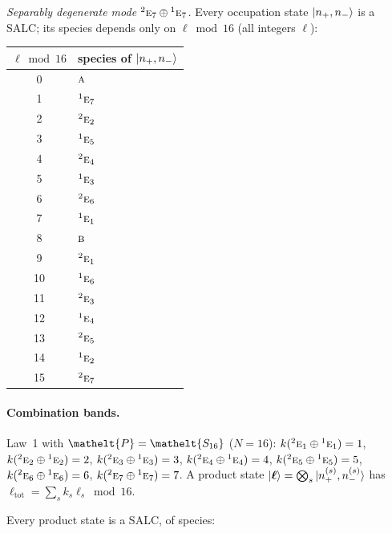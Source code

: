 \documentclass[11pt]{article}
\newcommand{\eltfont}[1]{{\let\sigma\eltsigma\mathelt{#1}}}
\newcommand{\irr}[1]{\text{\normalfont\scshape #1}}
\newcommand{\conjpair}[1]{{}^{#1}}
\newcommand{\elt}[1]{\eltfont{#1}}
\newcommand{\pel}{\elt{P}}             %
\begin{document}
\emph{Separably degenerate mode $\conjpair{2}\irr{e}_{7}\oplus \conjpair{1}\irr{e}_{7}$.} Every occupation state $\ket{n_+,n_-}$ is a SALC; its species depends only on $\ell\bmod 16$ (all integers $\ell$):
\begin{longtable}{c l}\hline $\ell\bmod 16$ & species of $\ket{n_+,n_-}$\\ \hline\endhead
0 & $\irr{a}$\\
1 & $\conjpair{1}\irr{e}_{7}$\\
2 & $\conjpair{2}\irr{e}_{2}$\\
3 & $\conjpair{1}\irr{e}_{5}$\\
4 & $\conjpair{2}\irr{e}_{4}$\\
5 & $\conjpair{1}\irr{e}_{3}$\\
6 & $\conjpair{2}\irr{e}_{6}$\\
7 & $\conjpair{1}\irr{e}_{1}$\\
8 & $\irr{b}$\\
9 & $\conjpair{2}\irr{e}_{1}$\\
10 & $\conjpair{1}\irr{e}_{6}$\\
11 & $\conjpair{2}\irr{e}_{3}$\\
12 & $\conjpair{1}\irr{e}_{4}$\\
13 & $\conjpair{2}\irr{e}_{5}$\\
14 & $\conjpair{1}\irr{e}_{2}$\\
15 & $\conjpair{2}\irr{e}_{7}$\\
\hline\end{longtable}

\paragraph{Combination bands.}

Law~1 with $\pel=\elt{S_{16}}$ ($N=16$): $k(\conjpair{2}\irr{e}_{1}\oplus \conjpair{1}\irr{e}_{1})=1$, $k(\conjpair{2}\irr{e}_{2}\oplus \conjpair{1}\irr{e}_{2})=2$, $k(\conjpair{2}\irr{e}_{3}\oplus \conjpair{1}\irr{e}_{3})=3$, $k(\conjpair{2}\irr{e}_{4}\oplus \conjpair{1}\irr{e}_{4})=4$, $k(\conjpair{2}\irr{e}_{5}\oplus \conjpair{1}\irr{e}_{5})=5$, $k(\conjpair{2}\irr{e}_{6}\oplus \conjpair{1}\irr{e}_{6})=6$, $k(\conjpair{2}\irr{e}_{7}\oplus \conjpair{1}\irr{e}_{7})=7$. A product state $\ket{\boldsymbol\ell}=\bigotimes_s\ket{n_+^{(s)},n_-^{(s)}}$ has $\ell_{\mathrm{tot}}=\sum_sk_s\ell_s\bmod 16$.

Every product state is a SALC, of species:
\end{document}
